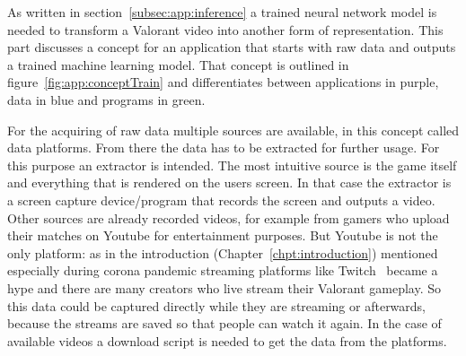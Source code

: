 As written in section~\ref{subsec:app:inference} a trained neural network model is needed to 
transform a Valorant video into another form of representation. This part discusses a concept for an 
application that starts with raw data and outputs a trained machine learning model. That concept is 
outlined in figure~\ref{fig:app:conceptTrain} and differentiates between applications in purple, data 
in blue and programs in green.

For the acquiring of raw data multiple sources are available, in this concept called data platforms. 
From there the data has to be extracted for further usage. For this purpose an extractor is intended.
The most intuitive source is the game itself and everything that is rendered on the users screen. In 
that case the extractor is a screen capture device/program that records the screen and outputs a 
video. Other sources are already recorded videos, for example from gamers who upload their 
matches on Youtube for entertainment purposes. But Youtube is not the only platform: as in the 
introduction (Chapter~\ref{chpt:introduction}) mentioned especially during corona pandemic 
streaming platforms like Twitch~\cite{twitch} became a hype and there are many creators who live 
stream their Valorant gameplay. So this data could be captured directly while they are streaming or 
afterwards, because the streams are saved so that people can watch it again. In the case of available 
videos a download script is needed to get the data from the platforms.

